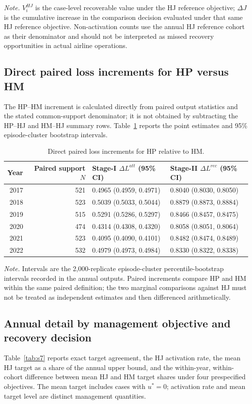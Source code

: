 \documentclass[10pt,a4paper]{article}
\numberwithin{equation}{section}
\begin{document}
\normalsize
\noindent\textit{Note.} $V_i^{HJ}$ is the case-level recoverable value under the HJ reference objective; $\Delta J$ is the cumulative increase in the comparison decision evaluated under that same HJ reference objective. Non-activation counts use the annual HJ reference cohort as their denominator and should not be interpreted as missed recovery opportunities in actual airline operations.

\subsection{Direct paired loss increments for HP versus HM}
The HP--HM increment is calculated directly from paired output statistics and the stated common-support denominator; it is not obtained by subtracting the HP--HJ and HM--HJ summary rows. Table~\ref{tab:s6} reports the point estimates and 95\% episode-cluster bootstrap intervals.

\begin{table}[htbp]
\centering\small
\caption{Direct paired loss increments for HP relative to HM.}\label{tab:s6}
\begin{tabular}{r r l l}
\toprule
Year & Paired support $N$ & Stage-I $\Delta L^{att}$ (95\% CI) & Stage-II $\Delta L^{rec}$ (95\% CI) \\
\midrule
2017 & 521 & 0.4965 (0.4959, 0.4971) & 0.8040 (0.8030, 0.8050) \\
2018 & 523 & 0.5039 (0.5033, 0.5044) & 0.8879 (0.8873, 0.8884) \\
2019 & 515 & 0.5291 (0.5286, 0.5297) & 0.8466 (0.8457, 0.8475) \\
2020 & 474 & 0.4314 (0.4308, 0.4320) & 0.8058 (0.8051, 0.8064) \\
2021 & 523 & 0.4095 (0.4090, 0.4101) & 0.8482 (0.8474, 0.8489) \\
2022 & 532 & 0.4979 (0.4973, 0.4984) & 0.8330 (0.8322, 0.8338) \\
\bottomrule
\end{tabular}
\end{table}
\noindent\textit{Note.} Intervals are the 2,000-replicate episode-cluster percentile-bootstrap intervals recorded in the annual outputs. Paired increments compare HP and HM within the same paired definition; the two marginal comparisons against HJ must not be treated as independent estimates and then differenced arithmetically.

\subsection{Annual detail by management objective and recovery decision}
Table~\ref{tab:s7} reports exact target agreement, the HJ activation rate, the mean HJ target as a share of the annual upper bound, and the within-year, within-cohort difference between mean HJ and HM target shares under four prespecified objectives. The mean target includes cases with $u^*=0$; activation rate and mean target level are distinct management quantities.
\end{document}
